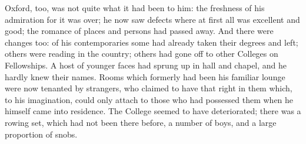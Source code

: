 Oxford, too, was not quite what it had been to him: the freshness
of his admiration for it was over; he now saw defects where at first
all was excellent and good; the romance of places and persons had
passed away. And there were changes too: of his contemporaries some
had already taken their degrees and left; others were reading in the
country; others had gone off to other Colleges on Fellowships. A host
of younger faces had sprung up in hall and chapel, and he hardly
knew their names. Rooms which formerly had been his familiar lounge
were now tenanted by strangers, who claimed to have that right in them
which, to his imagination, could only attach to those who had
possessed them when he himself came into residence. The College seemed
to have deteriorated; there was a rowing set, which had not been there
before, a number of boys, and a large proportion of snobs.

